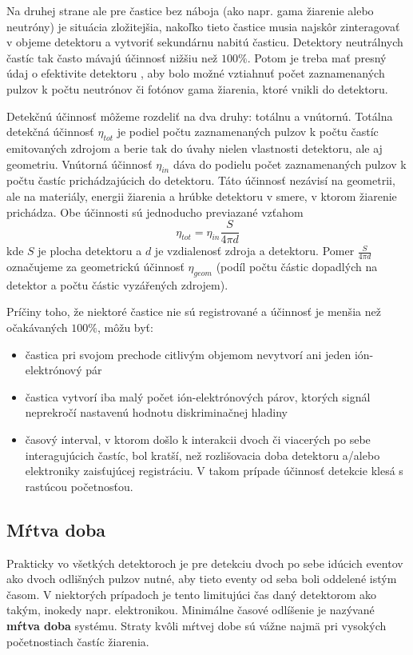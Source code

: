 \documentclass[../../main.tex]{subfiles}
\begin{document}
Na druhej strane ale pre častice bez náboja (ako napr. gama žiarenie alebo neutróny) je situácia zložitejšia, nakoľko tieto častice musia najskôr zinteragovať v objeme detektoru a vytvoriť sekundárnu nabitú časticu. Detektory neutrálnych častíc tak často mávajú účinnosť nižšiu než $100\%$. Potom je treba mať presný údaj o efektivite detektoru , aby bolo možné vztiahnuť počet zaznamenaných pulzov k počtu neutrónov či fotónov gama žiarenia, ktoré vnikli do detektoru.

Detekčnú účinnosť môžeme rozdeliť na dva druhy: totálnu a vnútornú. Totálna detekčná účinnosť $\eta_{tot}$ je podiel počtu zaznamenaných pulzov k počtu častíc emitovaných zdrojom a berie tak do úvahy nielen vlastnosti detektoru, ale aj geometriu. Vnútorná účinnosť $\eta_{in}$ dáva do podielu počet zaznamenaných pulzov k počtu častíc prichádzajúcich do detektoru. Táto účinnosť nezávisí na geometrii, ale na materiály, energii žiarenia a hrúbke detektoru v smere, v ktorom žiarenie prichádza. Obe účinnosti sú jednoducho previazané vzťahom
\begin{equation}
\eta_{tot}=\eta_{in}\dfrac{S}{4\pi d}
\end{equation}
kde $S$ je plocha detektoru a $d$ je vzdialenosť zdroja a detektoru. Pomer $\frac{S}{4\pi d}$ označujeme za geometrickú účinnosť $\eta_{geom}$ (podíl počtu částic dopadlých na detektor a počtu částic vyzářených zdrojem).

Príčiny toho, že niektoré častice nie sú registrované a účinnosť je menšia než očakávaných $100\%$, môžu byť:
\begin{itemize}
\item častica pri svojom prechode citlivým objemom nevytvorí ani jeden ión-elektrónový pár
\item častica vytvorí iba malý počet ión-elektrónových párov, ktorých signál neprekročí nastavenú hodnotu diskriminačnej hladiny
\item časový interval, v ktorom došlo k interakcii dvoch či viacerých po sebe interagujúcich častíc, bol kratší, než rozlišovacia doba detektoru a/alebo elektroniky zaisťujúcej registráciu. V takom prípade účinnosť detekcie klesá s rastúcou početnosťou.
\end{itemize}

\subsection{Mŕtva doba}

Prakticky vo všetkých detektoroch je pre detekciu dvoch po sebe idúcich eventov ako dvoch odlišných pulzov nutné, aby tieto eventy od seba boli oddelené istým časom. V niektorých prípadoch je tento limitujúci čas daný detektorom ako takým, inokedy napr. elektronikou. Minimálne časové odlíšenie je nazývané \textbf{mŕtva doba} systému. Straty kvôli mŕtvej dobe sú vážne najmä pri vysokých početnostiach častíc žiarenia.
\end{document}
